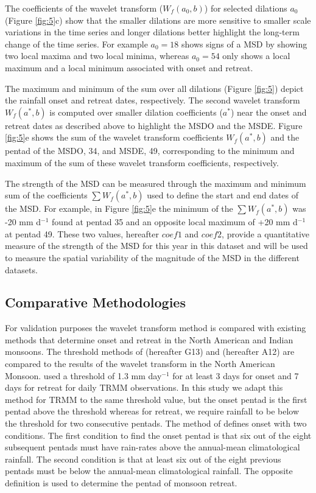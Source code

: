 The coefficients of the wavelet transform ($W_f(a_0,b)$) for selected dilations $a_0$  (Figure \ref{fig:5}c) show that the smaller dilations are more sensitive to smaller scale variations in the time series and longer dilations better highlight the long-term change of the time series. For example $a_0=18$ shows signs of a MSD by showing two local maxima and two local minima, whereas $a_0=54$ only shows a local maximum and a local minimum associated with onset and retreat.

The maximum and minimum of the sum over all dilations (Figure \ref{fig:5}) depict the rainfall onset and retreat dates, respectively. The second wavelet transform $W_f(a^*,b)$ is computed over smaller dilation coefficients ($a^*$) near the onset and retreat dates as described above to highlight the MSDO and the MSDE.
Figure \ref{fig:5}e shows the sum of the wavelet transform coefficients  $W_f(a^*,b)$ and the pentad of the MSDO, 34, and MSDE, 49, corresponding to the minimum and maximum of the sum of these wavelet transform coefficients, respectively.

The strength of the MSD can be measured through the maximum and minimum sum of the coefficients $\sum W_f(a^*,b)$ used to define the start and end dates of the MSD.
For example, in Figure \ref{fig:5}e the minimum of the $\sum W_f(a^*,b)$ was -20 mm d$^{-1}$ found at pentad 35 and an opposite local maximum of +20 mm d$^{-1}$ at pentad 49. These two values, hereafter $coef1$ and $coef2$, provide a quantitative measure of the strength of the MSD for this year in this dataset and will be used to measure the spatial variability of the magnitude of the MSD in the different datasets.

\subsection{Comparative Methodologies}


For validation purposes the wavelet transform method is compared with existing methods that determine onset and retreat in the North American and Indian monsoons. 
The threshold methods of \cite{geil2013} (hereafter G13) and \cite{arias2012} (hereafter A12) are compared to the results of the wavelet transform in the North American Monsoon.
 used a threshold of 1.3 mm day$^{-1}$ for at least 3 days for onset and 7 days for retreat for daily TRMM observations. In this study we adapt this method for TRMM to the same threshold value, but the onset pentad is the first pentad above the threshold whereas for retreat, we require rainfall to be below the threshold for two consecutive pentads.
 The method of  defines onset with two conditions. The first condition to find the onset pentad is that six out of the eight subsequent pentads must have rain-rates above the annual-mean climatological rainfall. The second condition is that at least six out of the eight previous pentads must be below the annual-mean climatological rainfall.
The opposite definition is used to determine the pentad of monsoon retreat. 

